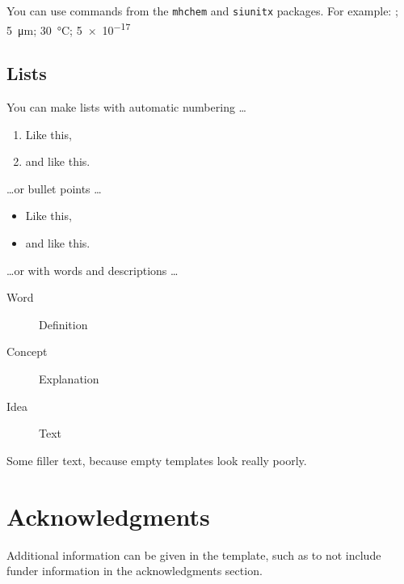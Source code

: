 \documentclass[9pt]{crone}
\begin{document}
You can use commands from the \texttt{mhchem} and \texttt{siunitx} packages. For example: ; \SI{5}{\micro\metre}; \SI{30}{\degreeCelsius}; \SI{5e-17}{\Molar}

\subsection{Lists}

You can make lists with automatic numbering \dots

\begin{enumerate}
\item Like this,
\item and like this.
\end{enumerate}
\dots or bullet points \dots
\begin{itemize} 
\item Like this,
\item and like this.
\end{itemize}
\dots or with words and descriptions \dots
\begin{description}
\item[Word] Definition
\item[Concept] Explanation
\item[Idea] Text
\end{description}

Some filler text, because empty templates look really poorly. \lipsum[1]


\section{Acknowledgments}

Additional information can be given in the template, such as to not include funder information in the acknowledgments section.



\end{document}
